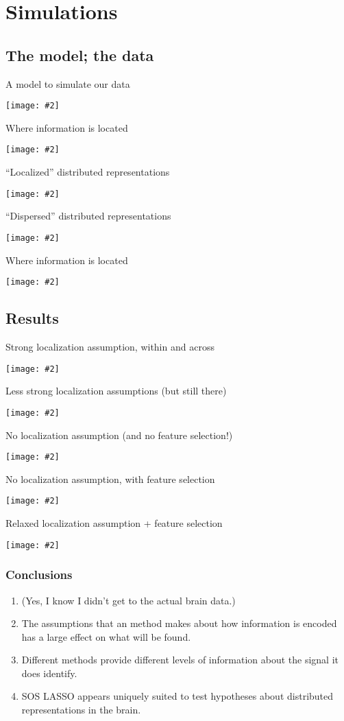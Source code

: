\documentclass{beamer}
\newcommand {\framedgraphic}[2] {
    \begin{frame}{#1}
        \begin{center}
            \texttt{[image: \#2]}
        \end{center}
    \end{frame}
}
\begin{document}
\section{Simulations}
\subsection{The model; the data}

\framedgraphic{A model to simulate our data}{../figures/model_outline.eps}
\framedgraphic{Where information is located}{../figures/between_within_dist.eps}
\framedgraphic{``Localized'' distributed representations}{data_demo_3.pdf}
\framedgraphic{``Dispersed'' distributed representations}{data_demo_4.pdf}

\framedgraphic{Where information is located}{../figures/between_within_dist.eps}

\subsection{Results}
\framedgraphic{Strong localization assumption, within and across}{../figures/univariate.eps}
\framedgraphic{Less strong localization assumptions (but still there)}{../figures/searchlight.eps}
\framedgraphic{No localization assumption (and no feature selection!)}{RidgeTritile_grey.pdf}
\framedgraphic{No localization assumption, with feature selection}{lasso_only.eps}
\framedgraphic{Relaxed localization assumption + feature selection}{soslasso_only.eps}

\begin{frame}
\frametitle{Conclusions}
\begin{enumerate}
\pause \item (Yes, I know I didn't get to the actual brain data.)
\pause \item The assumptions that an method makes about how information is encoded has a large effect on what will be found.
\pause \item Different methods provide different levels of information about the signal it does identify.
\pause \item SOS LASSO appears uniquely suited to test hypotheses about distributed representations in the brain.
\end{enumerate}
\end{frame}
\end{document}
